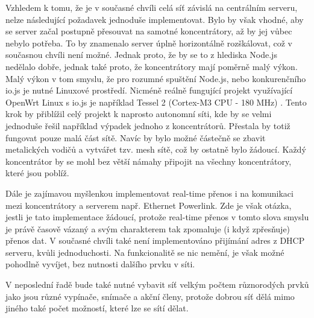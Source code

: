 Vzhledem k tomu, že je v současné chvíli celá síť závislá na centrálním serveru, nelze následující požadavek jednoduše implementovat. Bylo by však vhodné, aby se server začal postupně přesouvat na samotné koncentrátory, až by jej vůbec nebylo potřeba. To by znamenalo server úplně horizontálně rozškálovat, což v současnou chvíli není možné. Jednak proto, že by se to z hlediska Node.js nedělalo dobře, jednak také proto, že koncentrátory mají poměrně malý výkon. Malý výkon v tom smyslu, že pro rozumné spuštění Node.js, nebo konkurenčního io.js je nutné Linuxové prostředí. Nicméně reálně fungující projekt využívající OpenWrt Linux \cite{openwrt} s io.js je například Tessel 2 (Cortex\texttrademark-M3 CPU - 180 MHz) \cite{tessel}. Tento krok by přiblížil celý projekt k naprosto autonomní síti, kde by se velmi jednoduše řešil například výpadek jednoho z koncentrátorů. Přestala by totiž fungovat pouze malá část sítě. Navíc by bylo možné částečně se zbavit metalických vodičů a vytvářet tzv. mesh sítě, což by ostatně bylo žádoucí. Každý koncentrátor by se mohl bez větší námahy připojit na všechny koncentrátory, které jsou poblíž.


Dále je zajímavou myšlenkou implementovat real-time přenos i na komunikaci mezi koncentrátory a serverem např. Ethernet Powerlink. Zde je však otázka, jestli je tato implementace žádoucí, protože real-time přenos v tomto slova smyslu je právě časově vázaný a svým charakterem tak zpomaluje (i když zpřesňuje) přenos dat. V současné chvíli také není implementováno přijímání adres z DHCP serveru, kvůli jednoduchosti. Na funkcionalitě se nic nemění, je však možné pohodlně vyvíjet, bez nutnosti dalšího prvku v síti.

V neposlední řadě bude také nutné vybavit síť velkým počtem růz\-no\-ro\-dých prvků jako jsou různé vypínače, snímače a akční členy, protože dobrou síť dělá mimo jiného také počet možností, které lze se sítí dělat.